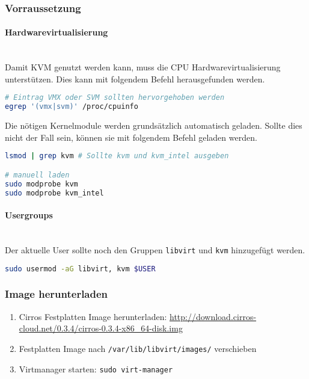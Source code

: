 \subsubsection{Vorraussetzung}
\paragraph{Hardwarevirtualisierung} \hfill \\
Damit KVM genutzt werden kann, muss die CPU Hardwarevirtualisierung unterstützen. Dies kann mit folgendem Befehl herausgefunden werden.
\begin{lstlisting}[language=bash]
# Eintrag VMX oder SVM sollten hervorgehoben werden
egrep '(vmx|svm)' /proc/cpuinfo
\end{lstlisting}

Die nötigen Kernelmodule werden grundsätzlich automatisch geladen. Sollte dies nicht der Fall sein, können sie mit folgendem Befehl geladen werden.
\begin{lstlisting}[language=bash]
lsmod | grep kvm # Sollte kvm und kvm_intel ausgeben 

# manuell laden
sudo modprobe kvm
sudo modprobe kvm_intel
\end{lstlisting}

\paragraph{Usergroups} \hfill \\
Der aktuelle User sollte noch den Gruppen \lstinline|libvirt| und \lstinline|kvm| hinzugefügt werden.
\begin{lstlisting}[language=bash]
sudo usermod -aG libvirt, kvm $USER
\end{lstlisting}





\subsubsection{Image herunterladen}
\begin{enumerate}
	\item Cirros Festplatten Image herunterladen: \url{http://download.cirros-cloud.net/0.3.4/cirros-0.3.4-x86_64-disk.img}
	\item Festplatten Image nach \lstinline|/var/lib/libvirt/images/| verschieben
	\item Virtmanager starten: \lstinline|sudo virt-manager|
\end{enumerate}

